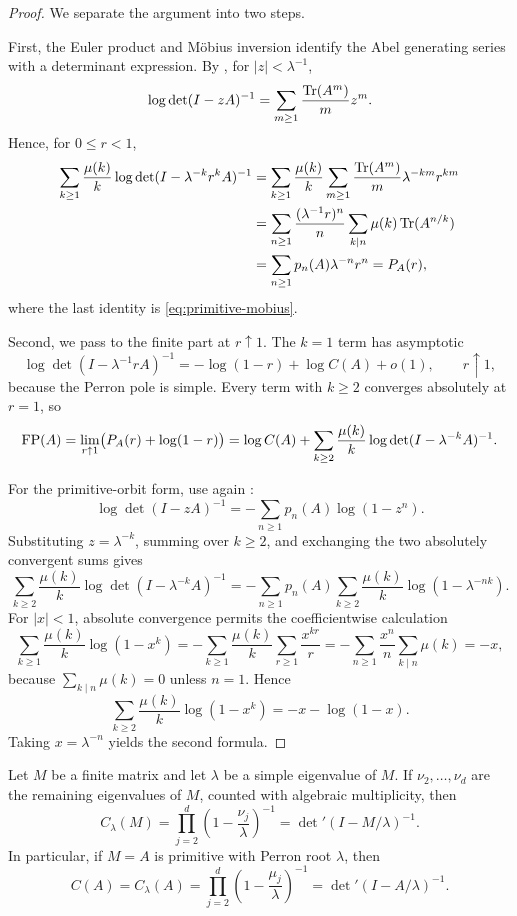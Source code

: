 \begin{proof}
  We separate the argument into two steps.

  First, the Euler product and M\"obius inversion identify the Abel
  generating series with a determinant expression. By
  , for \(|z|<\lambda^{-1}\),
  \[
    \log\det(I-zA)^{-1}
    =\sum_{m\ge 1}\frac{\operatorname{Tr}(A^m)}{m}z^m.
  \]
  Hence, for \(0\le r<1\),
  \begin{align*}
    \sum_{k\ge 1}\frac{\mu(k)}{k}
      \log\det(I-\lambda^{-k}r^kA)^{-1}
    &=
    \sum_{k\ge 1}\frac{\mu(k)}{k}
      \sum_{m\ge 1}\frac{\operatorname{Tr}(A^m)}{m}\lambda^{-km}r^{km} \\
    &=
    \sum_{n\ge 1}\frac{(\lambda^{-1}r)^n}{n}
      \sum_{k\mid n}\mu(k)\operatorname{Tr}(A^{n/k}) \\
    &=
    \sum_{n\ge 1}p_n(A)\lambda^{-n}r^n
    =P_A(r),
  \end{align*}
  where the last identity is \eqref{eq:primitive-mobius}.

  Second, we pass to the finite part at \(r\uparrow 1\). The \(k=1\)
  term has asymptotic
  \[
    \log\det(I-\lambda^{-1}rA)^{-1}
    =-\log(1-r)+\log C(A)+o(1),
    \qquad r\uparrow 1,
  \]
  because the Perron pole is simple. Every term with \(k\ge 2\)
  converges absolutely at \(r=1\), so
  \[
    \operatorname{FP}(A)
    =\lim_{r\uparrow 1}\bigl(P_A(r)+\log(1-r)\bigr)
    =\log C(A)+\sum_{k\ge 2}\frac{\mu(k)}{k}
      \log\det(I-\lambda^{-k}A)^{-1}.
  \]

  For the primitive-orbit form, use again
  :
  \[
    \log\det(I-zA)^{-1}
    =-\sum_{n\ge 1}p_n(A)\log(1-z^n).
  \]
  Substituting \(z=\lambda^{-k}\), summing over \(k\ge 2\), and
  exchanging the two absolutely convergent sums gives
  \[
    \sum_{k\ge 2}\frac{\mu(k)}{k}\log\det(I-\lambda^{-k}A)^{-1}
    =
    -\sum_{n\ge 1}p_n(A)
      \sum_{k\ge 2}\frac{\mu(k)}{k}\log(1-\lambda^{-nk}).
  \]
  For \(|x|<1\), absolute convergence permits the coefficientwise
  calculation
  \[
    \sum_{k\ge 1}\frac{\mu(k)}{k}\log(1-x^k)
    =-\sum_{k\ge 1}\frac{\mu(k)}{k}\sum_{r\ge 1}\frac{x^{kr}}{r}
    =-\sum_{n\ge 1}\frac{x^n}{n}\sum_{k\mid n}\mu(k)
    =-x,
  \]
  because \(\sum_{k\mid n}\mu(k)=0\) unless \(n=1\). Hence
  \[
    \sum_{k\ge 2}\frac{\mu(k)}{k}\log(1-x^k)=-x-\log(1-x).
  \]
  Taking \(x=\lambda^{-n}\) yields the second formula.
\end{proof}

\begin{proposition}
  \label{prop:finite-part-residue-reduced-determinant}
  Let \(M\) be a finite matrix and let \(\lambda\) be a simple
  eigenvalue of \(M\). If \(\nu_2,\dots,\nu_d\) are the remaining
  eigenvalues of \(M\), counted with algebraic multiplicity, then
  \[
    C_\lambda(M)
    =\prod_{j=2}^d\left(1-\frac{\nu_j}{\lambda}\right)^{-1}
    =\det\nolimits'(I-M/\lambda)^{-1}.
  \]
  In particular, if \(M=A\) is primitive with Perron root \(\lambda\),
  then
  \[
    C(A)=C_\lambda(A)
    =\prod_{j=2}^d\left(1-\frac{\mu_j}{\lambda}\right)^{-1}
    =\det\nolimits'(I-A/\lambda)^{-1}.
  \]
\end{proposition}

